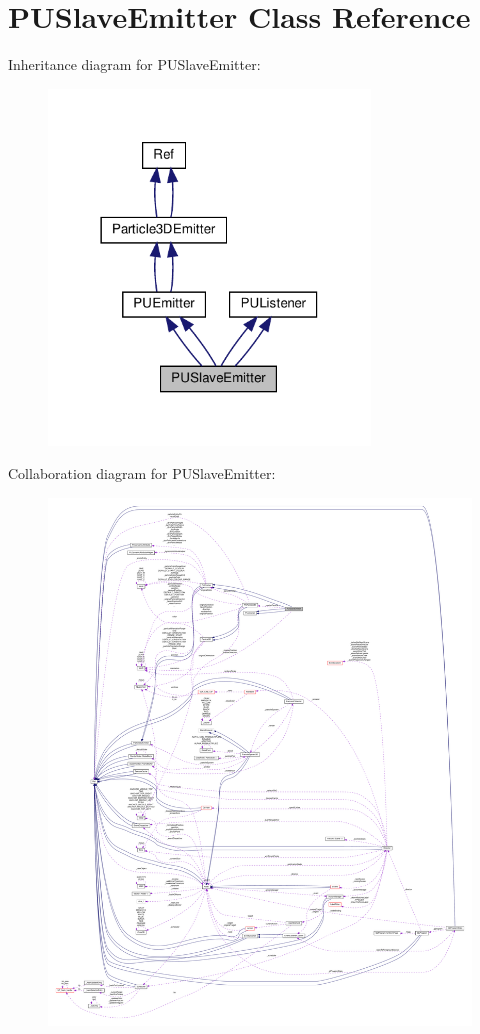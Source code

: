 \hypertarget{classPUSlaveEmitter}{}\section{P\+U\+Slave\+Emitter Class Reference}
\label{classPUSlaveEmitter}


Inheritance diagram for P\+U\+Slave\+Emitter\+:
\nopagebreak
\begin{figure}[H]
\begin{center}
\leavevmode
\includegraphics[width=242pt]{classPUSlaveEmitter__inherit__graph}
\end{center}
\end{figure}


Collaboration diagram for P\+U\+Slave\+Emitter\+:
\nopagebreak
\begin{figure}[H]
\begin{center}
\leavevmode
\includegraphics[width=350pt]{classPUSlaveEmitter__coll__graph}
\end{center}
\end{figure}
